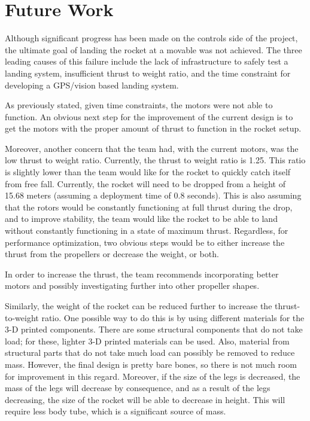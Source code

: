 \chapter{Future Work}
Although significant progress has been made on the controls side of the project, the ultimate goal of landing the rocket at a movable was not achieved. The three leading causes of this failure include the lack of infrastructure to safely test a landing system, insufficient thrust to weight ratio, and the time constraint for developing a GPS/vision based landing system.

As previously stated, given time constraints, the motors were not able to function. An obvious next step for the improvement of the current design is to get the motors with the proper amount of thrust to function in the rocket setup.

Moreover, another concern that the team had, with the current motors, was the low thrust to weight ratio. Currently, the thrust to weight ratio is 1.25. This ratio is slightly lower than the team would like for the rocket to quickly catch itself from free fall. Currently, the rocket will need to be dropped from a height of 15.68 meters (assuming a deployment time of 0.8 seconds). This is also assuming that the rotors would be constantly functioning at full thrust during the drop, and to improve stability, the team would like the rocket to be able to land without constantly functioning in a state of maximum thrust. Regardless, for performance optimization, two obvious steps would be to either increase the thrust from the propellers or decrease the weight, or both. 

In order to increase the thrust, the team recommends incorporating better motors and possibly investigating further into other propeller shapes.

Similarly, the weight of the rocket can be reduced further to increase the thrust-to-weight ratio. One possible way to do this is by using different materials for the 3-D printed components.  There are some structural components that do not take load; for these, lighter 3-D printed materials can be used. Also, material from structural parts that do not take much load can possibly be removed to reduce mass. However, the final design is pretty bare bones, so there is not much room for improvement in this regard. Moreover,  if the size of the legs is decreased, the mass of the legs will decrease by consequence, and as a result of the legs decreasing, the size of the rocket will be able to decrease in height. This will require less body tube, which is a significant source of mass.

